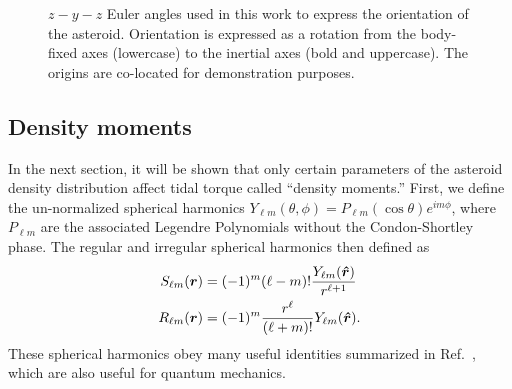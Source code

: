 \begin{figure}
    \centering
    \caption{$z-y-z$ Euler angles used in this work to express the orientation of the asteroid. Orientation is expressed as a rotation from the body-fixed axes (lowercase) to the inertial axes (bold and uppercase). The origins are co-located for demonstration purposes.}
    \label{fig:euler-angles}
\end{figure}


\subsection{Density moments}
\label{sec:moments}

In the next section, it will be shown that only certain parameters of the asteroid density distribution affect tidal torque called ``density moments.'' First, we define the un-normalized spherical harmonics $Y_{\ell m}(\theta, \phi) = P_{\ell m}(\cos \theta)e^{im\phi}$, where $P_{\ell m}$ are the associated Legendre Polynomials without the Condon-Shortley phase. The regular and irregular spherical harmonics then defined as
\begin{equation}
  \begin{split}
    S_{\ell m}(\bm r) &= (-1)^m (\ell - m)! \frac{Y_{\ell m}(\bm{\hat{r}})}{r^{\ell+1}} \\
    R_{\ell m} (\bm r) &= (-1)^m \frac{r^\ell}{(\ell + m)!} Y_{\ell m}(\bm{\hat{r}}).
  \end{split}
\end{equation}
These spherical harmonics obey many useful identities summarized in Ref.~\cite{Gelderen1998TheSO}, which are also useful for quantum mechanics.

